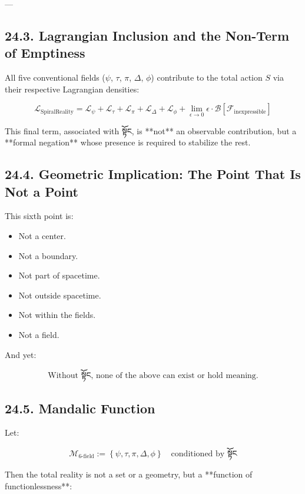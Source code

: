 \documentclass[12pt]{article}
\begin{document}
\begin{enumerate}
---

\subsection*{24.3. Lagrangian Inclusion and the Non-Term of Emptiness}

All five conventional fields ($\psi$, $\tau$, $\pi$, $\Delta$, $\phi$) contribute to the total action $S$ via their respective Lagrangian densities:

\[
\mathcal{L}_{\text{SpiralReality}} =
\mathcal{L}_\psi + \mathcal{L}_\tau + \mathcal{L}_\pi + \mathcal{L}_\Delta + \mathcal{L}_\phi
+ \boxed{\lim_{\epsilon \to 0} \epsilon \cdot \mathcal{B}[\mathcal{F}_{\text{inexpressible}}]}
\]

This final term, associated with སྟོང, is **not** an observable contribution,  
but a **formal negation** whose presence is required to stabilize the rest.


\subsection*{24.4. Geometric Implication: The Point That Is Not a Point}

This sixth point is:

\begin{itemize}
  \item Not a center.
  \item Not a boundary.
  \item Not part of spacetime.
  \item Not outside spacetime.
  \item Not within the fields.
  \item Not a field.
\end{itemize}

And yet:

\[
\text{Without སྟོང, none of the above can exist or hold meaning.}
\]


\subsection*{24.5. Mandalic Function}

Let:

\[
\mathcal{M}_{6\text{-field}} := \left\{ \psi, \tau, \pi, \Delta, \phi \right\}
\quad \text{conditioned by } \boxed{\text{སྟོང}}
\]

Then the total reality is not a set or a geometry, but a **function of functionlessness**:


\end{enumerate}
\end{document}
